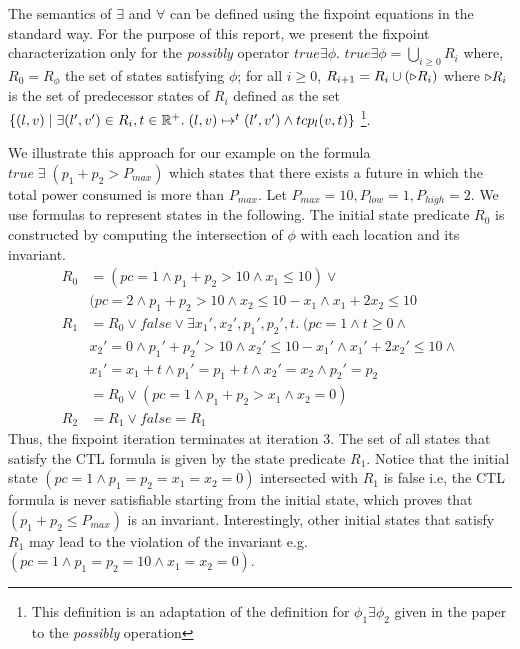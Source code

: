 The semantics of $\exists$ and $\forall$ can be defined using the fixpoint equations in the standard way.
For the purpose of this report, we present the fixpoint characterization only for 
the \emph{possibly} operator $true \exists \phi$.
$true \exists \phi = \bigcup_{i \ge 0} R_i$ where,
$R_0 = R_{\phi}$ the set of states satisfying $\phi$;
for all $i \ge 0$, $R_{i+1} = R_i \cup (\triangleright R_i)$ where $\triangleright R_i$ is the
set of predecessor states of $R_i$ defined as the set 
$\{ (l,v) \; | \; \exists (l',v') \in R_i, t \in \mathbb{R}^+. \; (l,v) \mapsto^t (l',v') \wedge tcp_l(v,t) \}$
\footnote{This definition is an adaptation of the definition for $\phi_1 \exists \phi_2$ given in the paper 
to the \emph{possibly} operation}.

We illustrate this approach for our example on the formula $true \; \exists \;(p_1 + p_2 > P_{max})$ which 
states that there exists a future in which the total power consumed is more than $P_{max}$.
Let $P_{max}=10, P_{low}=1, P_{high}=2$.
We use formulas to represent states in the following.
The initial state predicate $R_0$ is constructed by computing the intersection of $\phi$ with 
each location and its invariant.
%
\begin{align*}
R_0 &= (pc = 1 \wedge p_1 + p_2 > 10 \wedge x_1 \le 10) \vee \\
	& (pc = 2 \wedge p_1 + p_2 > 10 \wedge x_2 \le 10 - x_1 \wedge x_1+2x_2 \le 10 \\
R_1 &= R_0 \vee false \vee \exists x_1',x_2',p_1',p_2',t. \; (pc=1 \wedge t \ge 0 \wedge \\
	& x_2'=0 \wedge p_1'+p_2'>10 \wedge x_2' \le 10 - x_1' \wedge x_1'+2x_2' \le 10 \wedge \\
	& x_1' = x_1 + t \wedge p_1' = p_1 + t \wedge x_2' = x_2 \wedge p_2' = p_2 \\
	&= R_0 \vee (pc=1 \wedge p_1+p_2 >x_1 \wedge x_2 = 0) \\
R_2 &= R_1 \vee false	= R_1
\end{align*}
%
Thus, the fixpoint iteration terminates at iteration 3. The set of all states that satisfy the 
CTL formula is given by the state predicate $R_1$. Notice that the initial state  
$(pc=1 \wedge p_1=p_2=x_1=x_2=0)$ intersected with $R_1$ is false i.e, the CTL formula is never
satisfiable starting from the initial state, which proves that $(p_1 + p_2 \le P_{max})$ is an invariant.
Interestingly, other initial states that satisfy $R_1$ may lead to the violation of the invariant
e.g. $(pc=1 \wedge p_1=p_2=10 \wedge x_1=x_2=0)$.

\pagebreak